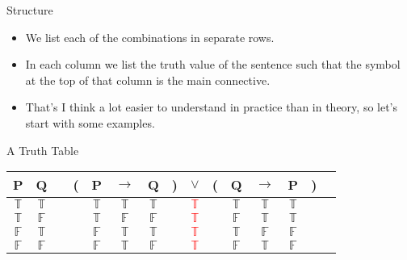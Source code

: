 \documentclass[
  ignorenonframetext,
]{beamer}
\providecommand{\tightlist}{%
  \setlength{\itemsep}{0pt}\setlength{\parskip}{0pt}}
\renewcommand{\,}{\text{, }}
\def\True{\mathbb{T}}
\def\False{\mathbb{F}}
\begin{document}
\begin{frame}{Structure}
\protect\hypertarget{structure}{}
\begin{itemize}
\tightlist
\item
  We list each of the combinations in separate rows.
\item
  In each column we list the truth value of the sentence such that the
  symbol at the top of that column is the main connective.
\item
  That's I think a lot easier to understand in practice than in theory,
  so let's start with some examples.
\end{itemize}
\end{frame}

\begin{frame}{A Truth Table}
\protect\hypertarget{a-truth-table}{}
\begin{center}
\begin{tabular}{@{ }c@{ }@{ }c | c@{ }@{}c@{}@{ }c@{ }@{ }c@{ }@{ }c@{ }@{}c@{}@{ }c@{ }@{}c@{}@{ }c@{ }@{ }c@{ }@{ }c@{ }@{}c@{}@{ }c}
P & Q &  & ( & P & $\rightarrow$ & Q & ) & $\lor$ & ( & Q & $\rightarrow$ & P & ) & \\
\hline 
$\True$ & $\True$ &  &  & $\True$ & $\True$ & $\True$ &  & \textcolor{red}{$\True$} &  & $\True$ & $\True$ & $\True$ &  & \\
$\True$ & $\False$ &  &  & $\True$ & $\False$ & $\False$ &  & \textcolor{red}{$\True$} &  & $\False$ & $\True$ & $\True$ &  & \\
$\False$ & $\True$ &  &  & $\False$ & $\True$ & $\True$ &  & \textcolor{red}{$\True$} &  & $\True$ & $\False$ & $\False$ &  & \\
$\False$ & $\False$ &  &  & $\False$ & $\True$ & $\False$ &  & \textcolor{red}{$\True$} &  & $\False$ & $\True$ & $\False$ &  & \\
\end{tabular}

\end{center}
\end{frame}
\end{document}
